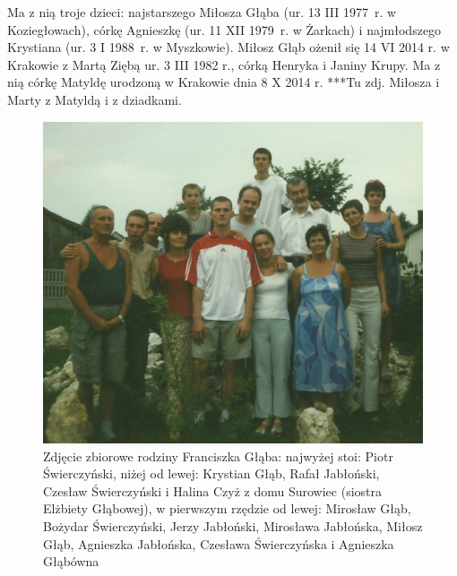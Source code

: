 Ma z nią troje dzieci: najstarszego Miłosza Głąba (ur. 13 III 1977~r. w Koziegłowach), córkę Agnieszkę (ur. 11 XII 1979~r. w Żarkach) i najmłodszego Krystiana (ur. 3 I 1988~r. w Myszkowie).
Miłosz Głąb ożenił się 14 VI 2014 r. w Krakowie z Martą Ziębą ur. 3 III 1982 r., córką Henryka i Janiny Krupy. Ma z nią córkę Matyldę urodzoną w Krakowie dnia 8 X 2014 r. 
***Tu zdj. Miłosza i Marty z Matyldą i z dziadkami.
\begin{figure}[!h]
\begin{center}
\includegraphics[width=\textwidth]{zdjecia/rodzina_franciszka_glaba.jpg}
\caption[Zdjęcie zbiorowe rodziny Franciszka Głąba]{Zdjęcie zbiorowe rodziny Franciszka Głąba: najwyżej stoi: Piotr Świerczyński, niżej od lewej: Krystian Głąb, Rafał Jabłoński, Czesław Świerczyński i Halina Czyż z domu Surowiec (siostra Elżbiety Głąbowej), w pierwszym rzędzie od lewej: Mirosław Głąb, Bożydar Świerczyński, Jerzy Jabłoński, Mirosława Jabłońska, Miłosz Głąb, Agnieszka Jabłońska, Czesława Świerczyńska i Agnieszka Głąbówna}
\label{rys:rodzina_franciszka_glaba}
\end{center}
\end{figure}